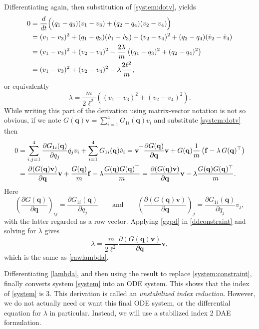 \documentclass[letterpaper,final,12pt,reqno]{amsart}
\newcommand{\bbf}{\mathbf{f}}
\newcommand{\bq}{\mathbf{q}}
\newcommand{\bv}{\mathbf{v}}
\begin{document}
Differentiating again, then substitution of \eqref{system:dotv}, yields
\begin{align}
0 &= \frac{d}{dt} \Big((q_1 - q_3)(v_1 - v_3) + (q_2 - q_4) (v_2 - v_4)\Big) \notag \\
  &= (v_1 - v_3)^2 + (q_1 - q_3) (\dot v_1 - \dot v_3) + (v_2 - v_4)^2 + (q_2 - q_4) (\dot v_2 - \dot v_4)  \notag \\
  &= (v_1 - v_3)^2 + (v_2 - v_4)^2 - \frac{2\lambda}{m} \left((q_1 - q_3)^2 + (q_2 - q_4)^2\right) \notag \\
  &= (v_1 - v_3)^2 + (v_2 - v_4)^2 - \lambda \frac{2 \ell^2}{m}, \label{rawddconstraint}
\end{align}
or equivalently
\begin{equation}
\lambda = \frac{m}{2\ell^2} \left((v_1 - v_3)^2 + (v_2 - v_4)^2\right). \label{rawlambda}
\end{equation}
While writing this part of the derivation using matrix-vector notation is not so obvious, if we note $G(\bq)\bv = \sum_{i=1}^4 G_{1i}(\bq) v_i$ and substitute \eqref{system:dotv} then
\begin{align}
0 &= \sum_{i,j=1}^4 \frac{\partial G_{1i}(\bq)}{\partial q_j} \dot q_j v_i + \sum_{i=1}^4 G_{1i}(\bq) \dot v_i = \bv^\top \frac{\partial G(\bq)}{\partial \bq} \bv + G(\bq) \frac{1}{m} \left(\bbf - \lambda\, G(\bq)^\top\right) \notag \\
  &= \frac{\partial (G(\bq)\bv)}{\partial \bq} \bv +  \frac{G(\bq)}{m} \bbf - \lambda \frac{G(\bq) G(\bq)^\top}{m} = \frac{\partial (G(\bq)\bv)}{\partial \bq} \bv - \lambda \frac{G(\bq) G(\bq)^\top}{m}.  \label{ddconstraint}
\end{align}
Here
\begin{equation}
\left(\frac{\partial G(\bq)}{\partial \bq}\right)_{ij} = \frac{\partial G_{1i}(\bq)}{\partial q_j} \qquad \text{and} \qquad
\left(\frac{\partial (G(\bq)\bv)}{\partial \bq}\right)_{j} = \frac{\partial G_{1i}(\bq)}{\partial q_j} v_j,
\end{equation}
with the latter regarded as a row vector.  Applying \eqref{ggpd} in \eqref{ddconstraint} and solving for $\lambda$ gives
\begin{equation}
\lambda = \frac{m}{2\ell^2} \frac{\partial (G(\bq)\bv)}{\partial \bq} \bv, \label{lambda}
\end{equation}
which is the same as \eqref{rawlambda}.

Differentiating \eqref{lambda}, and then using the result to replace \eqref{system:constraint}, finally converts system \eqref{system} into an ODE system.  This shows that the index of \eqref{system} is 3.  This derivation is called an \emph{unstabilized index reduction}.  However, we do not actually need or want this final ODE system, or the differential equation for $\dot \lambda$ in particular.  Instead, we will use a stabilized index 2 DAE formulation.
\end{document}
